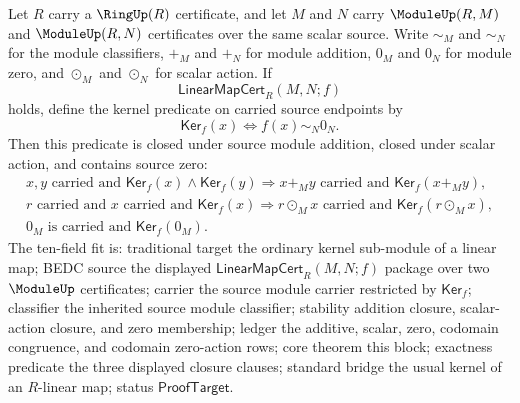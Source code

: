 \begin{theorem}
\label{thm:module-linearmap-kernel-submodule-closure}
Let $R$ carry a $\RingUp(R)$ certificate, and let $M$ and $N$ carry $\ModuleUp(R,M)$ and $\ModuleUp(R,N)$ certificates over the same scalar source. Write $\sim_M$ and $\sim_N$ for the module classifiers, $+_M$ and $+_N$ for module addition, $0_M$ and $0_N$ for module zero, and $\odot_M$ and $\odot_N$ for scalar action. If
$$
\mathsf{LinearMapCert}_R(M,N;f)
$$
holds, define the kernel predicate on carried source endpoints by
$$
\mathsf{Ker}_f(x)\Longleftrightarrow f(x)\sim_N0_N.
$$
Then this predicate is closed under source module addition, closed under scalar action, and contains source zero:
$$
\begin{gathered}
x,y\text{ carried and }\mathsf{Ker}_f(x)\land\mathsf{Ker}_f(y)\Longrightarrow x+_M y\text{ carried and }\mathsf{Ker}_f(x+_M y),\\
r\text{ carried and }x\text{ carried and }\mathsf{Ker}_f(x)\Longrightarrow r\odot_M x\text{ carried and }\mathsf{Ker}_f(r\odot_M x),\\
0_M\text{ is carried and }\mathsf{Ker}_f(0_M).
\end{gathered}
$$
The ten-field fit is: traditional target the ordinary kernel sub-module of a linear map; BEDC source the displayed $\mathsf{LinearMapCert}_R(M,N;f)$ package over two $\ModuleUp$ certificates; carrier the source module carrier restricted by $\mathsf{Ker}_f$; classifier the inherited source module classifier; stability addition closure, scalar-action closure, and zero membership; ledger the additive, scalar, zero, codomain congruence, and codomain zero-action rows; core theorem this block; exactness predicate the three displayed closure clauses; standard bridge the usual kernel of an $R$-linear map; status $\mathsf{ProofTarget}$.
\end{theorem}
